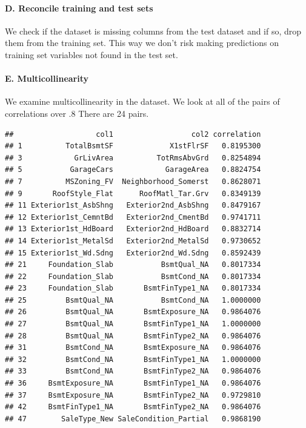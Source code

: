 \documentclass[
]{article}
\begin{document}
\hypertarget{d.-reconcile-training-and-test-sets}{%
\paragraph{D. Reconcile training and test
sets}\label{d.-reconcile-training-and-test-sets}}

We check if the dataset is missing columns from the test dataset and if
so, drop them from the training set. This way we don't risk making
predictions on training set variables not found in the test set.

\hypertarget{e.-multicollinearity}{%
\paragraph{E. Multicollinearity}\label{e.-multicollinearity}}

We examine multicollinearity in the dataset. We look at all of the pairs
of correlations over .8 There are 24 pairs.

\begin{verbatim}
##                   col1                  col2 correlation
## 1          TotalBsmtSF             X1stFlrSF   0.8195300
## 3            GrLivArea          TotRmsAbvGrd   0.8254894
## 5           GarageCars            GarageArea   0.8824754
## 7          MSZoning_FV  Neighborhood_Somerst   0.8628071
## 9       RoofStyle_Flat      RoofMatl_Tar.Grv   0.8349139
## 11 Exterior1st_AsbShng   Exterior2nd_AsbShng   0.8479167
## 12 Exterior1st_CemntBd   Exterior2nd_CmentBd   0.9741711
## 13 Exterior1st_HdBoard   Exterior2nd_HdBoard   0.8832714
## 14 Exterior1st_MetalSd   Exterior2nd_MetalSd   0.9730652
## 15 Exterior1st_Wd.Sdng   Exterior2nd_Wd.Sdng   0.8592439
## 21     Foundation_Slab           BsmtQual_NA   0.8017334
## 22     Foundation_Slab           BsmtCond_NA   0.8017334
## 23     Foundation_Slab       BsmtFinType1_NA   0.8017334
## 25         BsmtQual_NA           BsmtCond_NA   1.0000000
## 26         BsmtQual_NA       BsmtExposure_NA   0.9864076
## 27         BsmtQual_NA       BsmtFinType1_NA   1.0000000
## 28         BsmtQual_NA       BsmtFinType2_NA   0.9864076
## 31         BsmtCond_NA       BsmtExposure_NA   0.9864076
## 32         BsmtCond_NA       BsmtFinType1_NA   1.0000000
## 33         BsmtCond_NA       BsmtFinType2_NA   0.9864076
## 36     BsmtExposure_NA       BsmtFinType1_NA   0.9864076
## 37     BsmtExposure_NA       BsmtFinType2_NA   0.9729810
## 42     BsmtFinType1_NA       BsmtFinType2_NA   0.9864076
## 47        SaleType_New SaleCondition_Partial   0.9868190
\end{verbatim}
\end{document}
